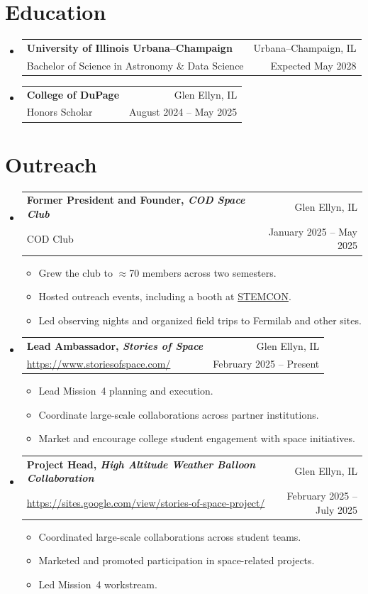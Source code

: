 \documentclass[letterpaper,11pt]{article}
\makeatletter
\newcommand{\cvitem}[1]{
  \item\small{{#1\vspace{-2pt}}}
}
\newcommand{\cvheading}[4]{
  \vspace{-2pt}\item
    \begin{tabular*}{\textwidth}[t]{l@{\extracolsep{\fill}}r}
      \textbf{#1} & #2 \\
      \small#3 & \small #4 \\
    \end{tabular*}\vspace{-7pt}
}
\newcommand{\cvheadingstart}{\begin{itemize}[leftmargin=0in, label={}]}
\newcommand{\cvheadingend}{\end{itemize}}
\newcommand{\cvitemstart}{\begin{itemize}[label=\textopenbullet]\justifying}
\newcommand{\cvitemend}{\end{itemize}\vspace{-5pt}}
\newcommand{\cvskill}[2]{
  \textcolor{black}{\textbf{#1}}\hfill
  \foreach \x in {1,...,5}{%
    \space{\ifnumgreater{\x}{#2}{\color{black!80!white!20}}{\color{black}}\faSquare}}\par%
  \vspace{-2pt}
}
\makeatother
\begin{document}
\section{Education}
\cvheadingstart
  \cvheading
    {University of Illinois Urbana--Champaign}{Urbana--Champaign, IL}
    {Bachelor of Science in Astronomy \& Data Science}{Expected May 2028}

  \cvheading
    {College of DuPage}{Glen Ellyn, IL}
    {Honors Scholar}{August 2024 -- May 2025}
\cvheadingend


\section{Outreach}
\cvheadingstart
  \cvheading
  {Former President and Founder, \textit{COD Space Club}}{Glen Ellyn, IL}
  {COD Club}{January 2025 -- May 2025}
  \cvitemstart
    \cvitem{Grew the club to $\approx$70 members across two semesters.}
    \cvitem{Hosted outreach events, including a booth at \href{https://www.cod.edu/calendar/event-details/9830596c-100a-43e0-ae95-58bfbdc18608}{STEMCON}.}
    \cvitem{Led observing nights and organized field trips to Fermilab and other sites.}
  \cvitemend

  \cvheading
    {Lead Ambassador, \textit{Stories of Space}}{Glen Ellyn, IL}
    {\href{https://www.storiesofspace.com/}{https://www.storiesofspace.com/}}{February 2025 -- Present}
    \cvitemstart
      \cvitem{Lead Mission~4 planning and execution.}
      \cvitem{Coordinate large-scale collaborations across partner institutions.}
      \cvitem{Market and encourage college student engagement with space initiatives.}
    \cvitemend

  \cvheading
    {Project Head, \textit{High Altitude Weather Balloon Collaboration}}{Glen Ellyn, IL}
    {\href{https://sites.google.com/view/stories-of-space-project/}{https://sites.google.com/view/stories-of-space-project/}}{February 2025 -- July 2025}
    \cvitemstart
      \cvitem{Coordinated large-scale collaborations across student teams.}
      \cvitem{Marketed and promoted participation in space-related projects.}
      \cvitem{Led Mission~4 workstream.}
    \cvitemend
\cvheadingend
\end{document}
